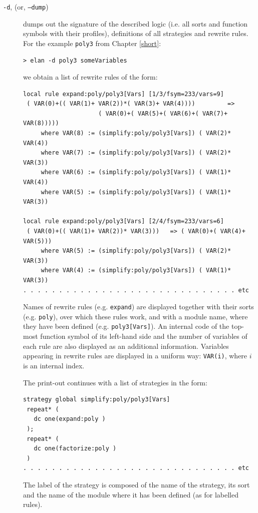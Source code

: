 \begin{description}
 \item[{\tt -d}, (or, {\tt --dump})]
      dumps out the signature of the described logic
      (i.e. all sorts and function symbols with their
      profiles), definitions of all strategies and rewrite rules.
      For the example \verb|poly3| from Chapter \ref{short}:
{\footnotesize\begin{verbatim}
> elan -d poly3 someVariables
\end{verbatim} }
\noindent
we obtain a list of rewrite rules of the form:
{\footnotesize\begin{verbatim}      
local rule expand:poly/poly3[Vars] [1/3/fsym=233/vars=9]
 ( VAR(0)+(( VAR(1)+ VAR(2))*( VAR(3)+ VAR(4))))         => 
                     ( VAR(0)+( VAR(5)+( VAR(6)+( VAR(7)+ VAR(8)))))
     where VAR(8) := (simplify:poly/poly3[Vars]) ( VAR(2)* VAR(4))
     where VAR(7) := (simplify:poly/poly3[Vars]) ( VAR(2)* VAR(3))
     where VAR(6) := (simplify:poly/poly3[Vars]) ( VAR(1)* VAR(4))
     where VAR(5) := (simplify:poly/poly3[Vars]) ( VAR(1)* VAR(3))

local rule expand:poly/poly3[Vars] [2/4/fsym=233/vars=6]
 ( VAR(0)+(( VAR(1)+ VAR(2))* VAR(3)))   => ( VAR(0)+( VAR(4)+ VAR(5)))
     where VAR(5) := (simplify:poly/poly3[Vars]) ( VAR(2)* VAR(3))
     where VAR(4) := (simplify:poly/poly3[Vars]) ( VAR(1)* VAR(3))
. . . . . . . . . . . . . . . . . . . . . . . . . . . . . . etc
\end{verbatim} }
\noindent 
Names of rewrite rules (e.g. \verb|expand|) are displayed
together with their sorts (e.g. \verb|poly|), over which these rules
work, and with a module name, where they have been defined
(e.g. \verb|poly3[Vars]|).  
An internal code of the top-most function symbol of its left-hand side 
and the number of variables of each rule are also displayed as an
additional information.  
Variables appearing in rewrite rules are displayed in a uniform way: \verb|VAR(i)|, where
$i$ is an internal index.

\noindent
The print-out continues with a list of strategies in the form:
{\footnotesize\begin{verbatim}
strategy global simplify:poly/poly3[Vars]
 repeat* (
   dc one(expand:poly )
 );
 repeat* (
   dc one(factorize:poly )
 )
. . . . . . . . . . . . . . . . . . . . . . . . . . . . . . etc
\end{verbatim} }
%
%
\noindent The label of the strategy is composed of the name of the
strategy, its sort and the name of the module where it has been
defined (as for labelled rules).


\end{description}
